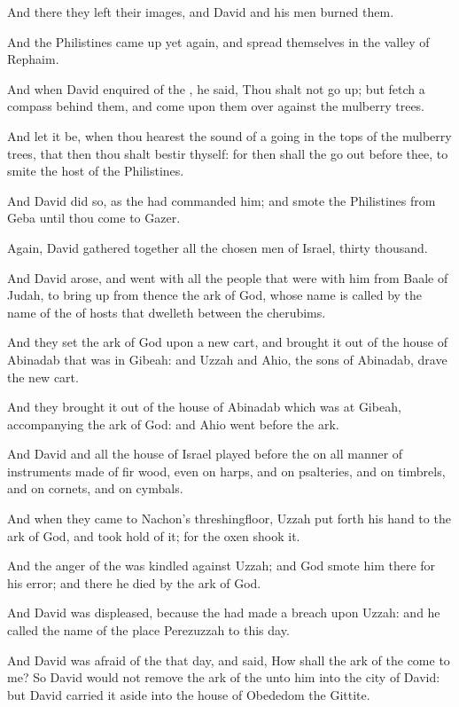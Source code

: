 \Verse And there they left their images, and David and his men burned them.

\Verse And the Philistines came up yet again, and spread themselves in the valley of Rephaim.

\Verse And when David enquired of the \LORD, he said, Thou shalt not go up; but fetch a compass behind them, and come upon them over against the mulberry trees.

\Verse And let it be, when thou hearest the sound of a going in the tops of the mulberry trees, that then thou shalt bestir thyself: for then shall the \LORD go out before thee, to smite the host of the Philistines.

\Verse And David did so, as the \LORD had commanded him; and smote the Philistines from Geba until thou come to Gazer.


\Chapter
\Verse Again, David gathered together all the chosen men of Israel, thirty thousand.

\Verse And David arose, and went with all the people that were with him from Baale of Judah, to bring up from thence the ark of God, whose name is called by the name of the \LORD of hosts that dwelleth between the cherubims.

\Verse And they set the ark of God upon a new cart, and brought it out of the house of Abinadab that was in Gibeah: and Uzzah and Ahio, the sons of Abinadab, drave the new cart.

\Verse And they brought it out of the house of Abinadab which was at Gibeah, accompanying the ark of God: and Ahio went before the ark.

\Verse And David and all the house of Israel played before the \LORD on all manner of instruments made of fir wood, even on harps, and on psalteries, and on timbrels, and on cornets, and on cymbals.

\Verse And when they came to Nachon's threshingfloor, Uzzah put forth his hand to the ark of God, and took hold of it; for the oxen shook it.

\Verse And the anger of the \LORD was kindled against Uzzah; and God smote him there for his error; and there he died by the ark of God.

\Verse And David was displeased, because the \LORD had made a breach upon Uzzah: and he called the name of the place Perezuzzah to this day.

\Verse And David was afraid of the \LORD that day, and said, How shall the ark of the \LORD come to me?  \Verse So David would not remove the ark of the \LORD unto him into the city of David: but David carried it aside into the house of Obededom the Gittite.

